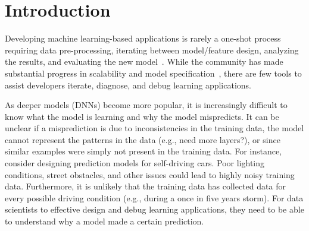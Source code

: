 \section{Introduction}\label{intro}
Developing machine learning-based applications is rarely a one-shot process requiring data pre-processing, iterating between model/feature design, analyzing the results, and evaluating the new model~\cite{sculley2014machine, krishnan2016hilda}.
While the community has made substantial progress in scalability and model specification~\cite{hellerstein2012madlib,tensor, kraska2013mlbase, crotty2014tupleware, keystone}, there are few tools to assist developers iterate, diagnose, and debug learning applications.


As deeper models (DNNs) become more popular, it is increasingly difficult to know what the model is learning and why the model mispredicts.
It can be unclear if a misprediction is due to inconsistencies in the training data, the model cannot represent the patterns in the data  (e.g., need more layers?), or since similar examples were simply not present in the training data.
For instance, consider designing prediction models for self-driving cars.  
Poor lighting conditions, street obstacles, and other issues could lead to highly noisy training data.
Furthermore, it is unlikely that the training data has collected data for every possible driving condition (e.g., during a once in five years storm).
For data scientists to effective design and debug learning applications, they need to be able to understand why a model made a certain prediction.

